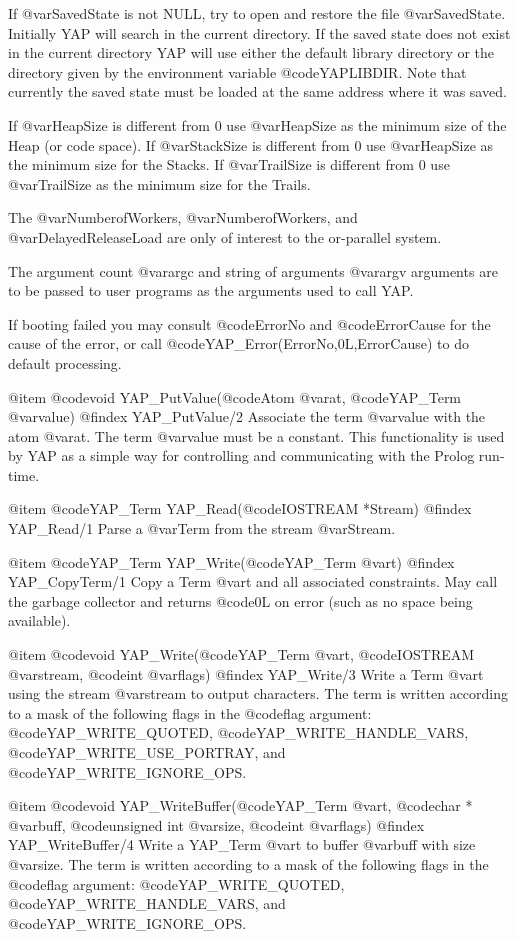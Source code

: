 {{{{{{{{If @var{SavedState} is not NULL, try to open and restore the file
@var{SavedState}. Initially YAP will search in the current directory. If
the saved state does not exist in the current directory YAP will use
either the default library directory or the directory given by the
environment variable @code{YAPLIBDIR}. Note that currently
the saved state must be loaded at the same address where it was saved.

If @var{HeapSize} is different from 0 use @var{HeapSize} as the minimum
size of the Heap (or code space). If @var{StackSize} is different from 0
use @var{HeapSize} as the minimum size for the Stacks. If
@var{TrailSize} is different from 0 use @var{TrailSize} as the minimum
size for the Trails.

The @var{NumberofWorkers}, @var{NumberofWorkers}, and
@var{DelayedReleaseLoad} are only of interest to the or-parallel system.

The argument count @var{argc} and string of arguments @var{argv}
arguments are to be passed to user programs as the arguments used to
call YAP.

If booting failed you may consult @code{ErrorNo} and @code{ErrorCause}
for the cause of the error, or call
@code{YAP_Error(ErrorNo,0L,ErrorCause)} to do default processing. 


@item  @code{void} YAP_PutValue(@code{Atom} @var{at}, @code{YAP_Term} @var{value})
@findex  YAP_PutValue/2
Associate the term @var{value} with the atom @var{at}. The term
@var{value} must be a constant. This functionality is used by YAP as a
simple way for controlling and communicating with the Prolog run-time.

@item  @code{YAP_Term} YAP_Read(@code{IOSTREAM *Stream})
@findex  YAP_Read/1
Parse a @var{Term} from the stream @var{Stream}.

@item  @code{YAP_Term} YAP_Write(@code{YAP_Term} @var{t})
@findex  YAP_CopyTerm/1
Copy a Term @var{t} and all associated constraints. May call the garbage
collector and returns @code{0L} on error (such as no space being
available).

@item  @code{void} YAP_Write(@code{YAP_Term} @var{t}, @code{IOSTREAM}
@var{stream}, @code{int} @var{flags})
@findex  YAP_Write/3
Write a Term @var{t} using the stream @var{stream} to output
characters. The term is written according to a mask of the following
flags in the @code{flag} argument: @code{YAP_WRITE_QUOTED},
@code{YAP_WRITE_HANDLE_VARS}, @code{YAP_WRITE_USE_PORTRAY},  and @code{YAP_WRITE_IGNORE_OPS}.

@item  @code{void} YAP_WriteBuffer(@code{YAP_Term} @var{t}, @code{char *}
@var{buff}, @code{unsigned int}
@var{size}, @code{int} @var{flags})
@findex  YAP_WriteBuffer/4
Write a YAP_Term @var{t} to buffer @var{buff} with size @var{size}. The
term is written according to a mask of the following flags in the
@code{flag} argument: @code{YAP_WRITE_QUOTED},
@code{YAP_WRITE_HANDLE_VARS}, and @code{YAP_WRITE_IGNORE_OPS}.

}}}}}}}}
